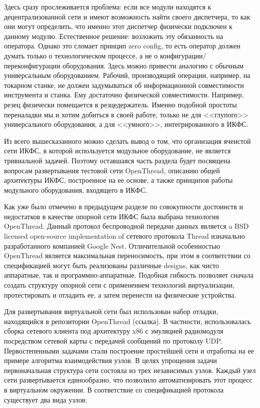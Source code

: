 Здесь сразу прослеживается проблема: если все модули находятся к децентрализованной сети и имеют возможность найти своего диспетчера, то как они могут определить, что именно этот диспетчер физически подключен к данному модулю. Естественное решение: возложить эту обязанность на оператора. Однако это сломает принцип zero config, то есть оператор должен думать только о технологическом процессе, а не о конфигурации/переконфигурации оборудования. Здесь можно привести аналогию с обычным универсальным оборудованием. Рабочий, производящий операции, например, на токарном станке, не должен задумываться об информационной совместимости инструмента и станка. Ему достаточно физической совместимости. Например, резец физически помещается в резцедержатель. Именно подобной простоты переналадки мы и хотим добиться в своей работе, только не для <<глупого>> универсального оборудования, а для <<умного>>, интегрированного в ИКФС.

Из всего вышесказанного можно сделать вывод о том, что организация ячеистой сети ИКФС, в которой используется модульное оборудование, не является тривиальной задачей. Поэтому оставшаяся часть раздела будет посвящена вопросам развертывания тестовой сети OpenThread, описанию общей архитектуры ИКФС, построенное на ее основе, а также принципов работы модульного оборудования, входящего в ИКФС.


Как уже было отмечено в предыдущем разделе по совокупности достоинств и недостатков в качестве опорной сети ИКФС была выбрана технология OpenThread. Данный протокол беспроводной передачи данных является a BSD licensed open-source implementation of сетевого протокола Thread изначально разработанного компанией Google Nest. Отличительной особенностью OpenThread является максимальная переносимость, при этом в соответствии со спецификацией  могут быть реализованы различные designs, как чисто аппаратные, так и программно-аппаратные. Подобная гибкость позволяет сначала создать структуру опорной сети с применением технологий виртуализации, протестировать и отладить ее, а затем перенести на физические устройства.

Для развертывания виртуальной сети был использован набор отладки, находящийся в репозитории OpenThread (ссылка). В частности, 	использовалась сборка сетевого клиента под архитектуру x86 с эмуляцией радиомодуля посредством сетевой карты с передачей сообщений по протоколу UDP. Первостепенными задачами стали построение простейшей сети и отработка на ее примере алгоритма взаимодействия узлов. В целях упрощения задачи первоначальная структура сети состояла из трех независимых узлов. Каждый узел сети развертывается единообразно, что позволило автоматизировать этот процесс в виртуальном окружении.
В соответствие со спецификацией протокола существует два вида узлов: 

